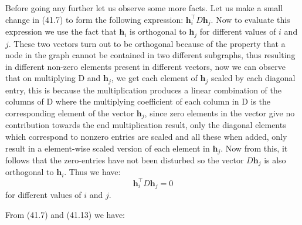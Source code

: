 \documentclass[english]{article}
\theoremstyle{plain}
\begin{document}
Before going any further let us observe some more facts. Let us make a small change in (41.7) to form the following expression:
$\boldsymbol{h}_{i}^{\top}D\boldsymbol{h}_{j}$. Now to evaluate this expression we use the fact that $\boldsymbol{h}_{i}$ is orthogonal to $\boldsymbol{h}_{j}$ for different values of $i$ and $j$. These two vectors turn out to be orthogonal because of the property that a node in the graph cannot be contained in two different subgraphs, thus resulting in different non-zero elements present in different vectors, now we can observe that on multiplying D and $\boldsymbol{h}_{j}$, we get each element of $\boldsymbol{h}_{j}$ scaled by each diagonal entry, this is because the multiplication produces a linear combination of the columns of D where the multiplying coefficient of each column in D is the corresponding element of the vector $\boldsymbol{h}_{j}$, since zero elements in the vector give no contribution towards the end multiplication result, only the diagonal elements which correspond to nonzero entries are scaled and all these when added, only result in a element-wise scaled version of each element in $\boldsymbol{h}_{j}$. Now from this, it follows that the zero-entries have not been disturbed so the vector $D\boldsymbol{h}_{j}$ is also orthogonal to $\boldsymbol{h}_{i}$. Thus we have: 
\begin{equation}
\boldsymbol{h}_{i}^{\top}D\boldsymbol{h}_{j} = 0
\end{equation}
for different values of $i$ and $j$. 

From (41.7) and (41.13) we have:
\end{document}
